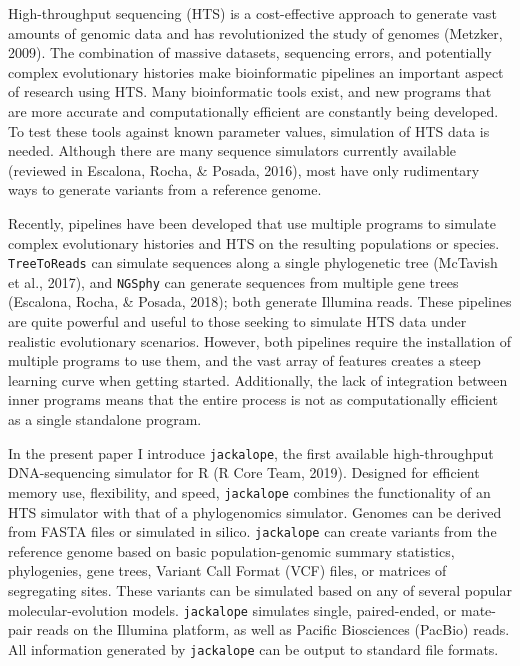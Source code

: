 \documentclass[12pt,]{article}
\begin{document}
High-throughput sequencing (HTS) is a cost-effective approach to generate vast amounts
of genomic data and has revolutionized the study of genomes
(Metzker, 2009).
The combination of massive datasets, sequencing errors, and potentially complex
evolutionary histories make bioinformatic pipelines an important aspect of
research using HTS.
Many bioinformatic tools exist, and new programs that are more accurate and
computationally efficient are constantly being developed.
To test these tools against known parameter values, simulation of HTS data is needed.
Although there are many sequence simulators currently available
(reviewed in Escalona, Rocha, \& Posada, 2016),
most have only rudimentary ways to generate variants from a reference genome.

Recently, pipelines have been developed that use multiple programs
to simulate complex evolutionary histories and HTS on the resulting populations
or species.
\texttt{TreeToReads} can simulate sequences along a single phylogenetic tree
(McTavish et al., 2017), and
\texttt{NGSphy} can generate sequences from multiple gene trees
(Escalona, Rocha, \& Posada, 2018);
both generate Illumina reads.
These pipelines are quite powerful and useful to those seeking to simulate
HTS data under realistic evolutionary scenarios.
However, both pipelines require the installation of multiple programs to use them,
and the vast array of features creates a steep learning curve when getting started.
Additionally, the lack of integration between inner programs means that the
entire process is not as computationally efficient as a single standalone program.

In the present paper I introduce \texttt{jackalope}, the first available high-throughput
DNA-sequencing simulator for R
(R Core Team, 2019).
Designed for efficient memory use, flexibility, and speed,
\texttt{jackalope} combines the functionality of an HTS simulator with that of a
phylogenomics simulator.
Genomes can be derived from FASTA files or simulated in silico.
\texttt{jackalope} can create variants from the reference genome based on basic
population-genomic summary statistics, phylogenies, gene trees,
Variant Call Format (VCF) files, or matrices of segregating sites.
These variants can be simulated based on any of several popular
molecular-evolution models.
\texttt{jackalope} simulates single, paired-ended, or mate-pair reads on the Illumina platform,
as well as Pacific Biosciences (PacBio) reads.
All information generated by \texttt{jackalope} can be output to standard file formats.
\end{document}
